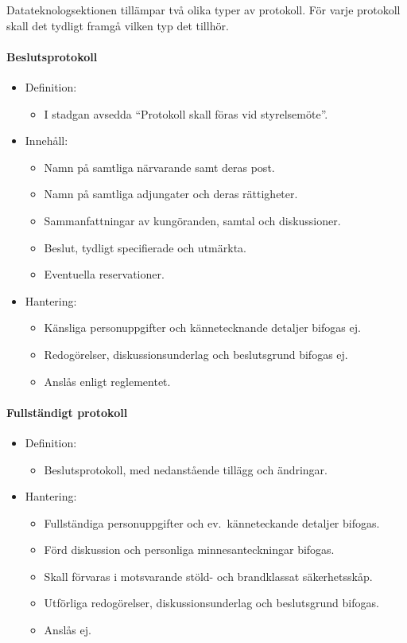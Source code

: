 \documentclass{dtek}
\begin{document}
Datateknologsektionen tillämpar två olika typer av protokoll. För varje protokoll skall det tydligt framgå vilken typ det tillhör.

\paragraph{Beslutsprotokoll}
\begin{itemize}[label={}]
  \item Definition:
  \begin{itemize}
    \item I stadgan avsedda ``Protokoll skall föras vid styrelsemöte''.
  \end{itemize}
  \item Innehåll:
  \begin{itemize}
    \item Namn på samtliga närvarande samt deras post.
    \item Namn på samtliga adjungater och deras rättigheter.
    \item Sammanfattningar av kungöranden, samtal och diskussioner.
    \item Beslut, tydligt specifierade och utmärkta.
    \item Eventuella reservationer.
  \end{itemize}
  \item Hantering:
  \begin{itemize}
    \item Känsliga personuppgifter och kännetecknande detaljer bifogas ej.
    \item Redogörelser, diskussionsunderlag och beslutsgrund bifogas ej.
    \item Anslås enligt reglementet.
  \end{itemize}
\end{itemize}

\paragraph{Fullständigt protokoll}
\begin{itemize}[label={}]
  \item Definition:
  \begin{itemize}
    \item Beslutsprotokoll, med nedanstående tillägg och ändringar.
  \end{itemize}
  \item Hantering:
  \begin{itemize}
    \item Fullständiga personuppgifter och ev.\ känneteckande detaljer bifogas.
    \item Förd diskussion och personliga minnesanteckningar bifogas.
    \item Skall förvaras i motsvarande stöld- och brandklassat säkerhetsskåp.
    \item Utförliga redogörelser, diskussionsunderlag och beslutsgrund bifogas.
    \item Anslås ej.
  \end{itemize}
\end{itemize}


\end{document}

